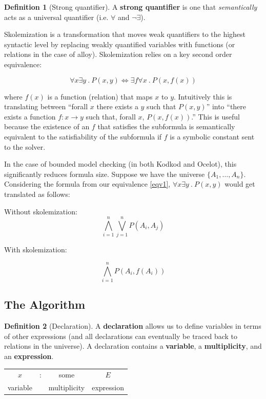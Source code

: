\documentclass[10pt]{article}
\theoremstyle{definition}
\newtheorem{definition}{Definition}[section]
\begin{document}
  \begin{definition}[Strong quantifier]
      A \textbf{strong quantifier} is one that \emph{semantically} acts as a universal quantifier (i.e. $\forall$ and $\neg \exists$).
  \end{definition}

  Skolemization is a transformation that moves weak quantifiers to the highest syntactic level by replacing weakly quantified variables with functions (or relations in the case of alloy). Skolemization relies on a key second order equivalence:

  \begin{equation} \label{eqv1}
      \forall x \exists y~.~P(x, y) \Leftrightarrow \exists f \forall x~.~P(x, f(x))
  \end{equation}

  where $f(x)$ is a function (relation) that maps $x$ to $y$. Intuitively this is translating between ``forall $x$ there exists a $y$ such that $P(x, y)$'' into ``there exists a function $f : x \rightarrow y$ such that, forall $x$, $P(x, f(x))$.'' This is useful because the existence of an $f$ that satisfies the subformula is semantically equivalent to the satisfiability of the subformula if $f$ is a symbolic constant sent to the solver.

  In the case of bounded model checking (in both Kodkod and Ocelot), this significantly reduces formula size. Suppose we have the universe $\{A_1, \dots, A_n\}$. Considering the formula from our equivalence \ref{eqv1}, $\forall x \exists y~.~P(x,y)$ would get translated as follows:

  Without skolemization:
  \begin{equation} \label{woskolem}
      \bigwedge_{i=1}^n\bigvee_{j=1}^n P(A_i, A_j)
  \end{equation}

  With skolemization:

  \begin{equation} \label{wskolem}
      \bigwedge_{i=1}^nP(A_i, f(A_i))
  \end{equation}

  \subsection{The Algorithm}

  \theoremstyle{definition}
  \begin{definition}[Declaration]
      A \textbf{declaration} allows us to define variables in terms of other expressions (and all declarations can eventually be traced back to relations in the universe). A declaration contains a \textbf{variable}, a \textbf{multiplicity}, and an \textbf{expression}.

      \begin{center}
          \begin{tabular}{c c c c}
              $x$ & : & some & $E$ \\
              variable & & multiplicity & expression
          \end{tabular}
      \end{center}
  \end{definition}
\end{document}

